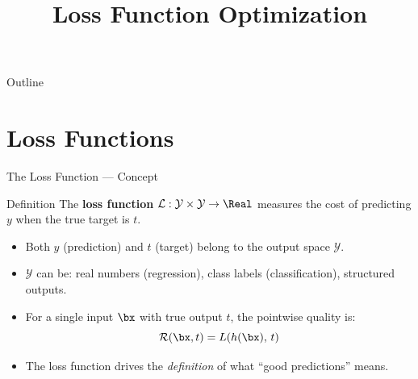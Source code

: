 \title[Loss Function Optimization]{Loss Function Optimization}

%

\begin{frame}[plain]
  \titlepage
\end{frame}

\begin{frame}{Outline}
  \tableofcontents
\end{frame}

\section{Loss Functions}

\begin{frame}{The Loss Function — Concept}
  \begin{block}{Definition}
    The \textbf{loss function} $\mathcal{L}:\mathcal{Y}\times\mathcal{Y}\to\Real$
    measures the \textcolor{AlertRed}{cost} of predicting $y$ when the true target is $t$.
  \end{block}
  \vspace{6pt}
  \begin{itemize}
    \item Both $y$ (prediction) and $t$ (target) belong to the output space $\mathcal{Y}$.
    \item $\mathcal{Y}$ can be: real numbers (regression), class labels (classification), structured outputs.
    \item For a single input $\bx$ with true output $t$, the pointwise quality is:
      \[
        \mathcal{R}(\bx,t) = L(h(\bx),\,t)
      \]
    \item The loss function drives the \emph{definition} of what ``good predictions'' means.
  \end{itemize}
\end{frame}

